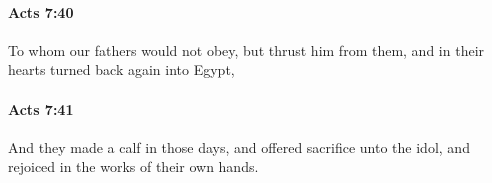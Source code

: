 		\paragraph{Acts 7:40} %
			\label{ACTS-7-40}

			To whom our fathers would not obey, but thrust him from them, and in their hearts turned back again into Egypt,

			\begin{framed}
			\scriptsize
				\begin{compactdesc}
					\item[SBLG] 
				\end{compactdesc}
			\end{framed}

		\paragraph{Acts 7:41} %
			\label{ACTS-7-41}

			And they made a calf in those days, and offered sacrifice unto the idol, and rejoiced in the works of their own hands.

